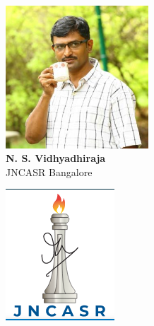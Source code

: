\documentclass[aspectratio=169,t]{beamer}
\begin{document}
\begin{frame}{}
\begin{minipage}{0.3\textwidth}
	\centering
	\includegraphics[width=0.4\textwidth]{nsv.jpeg}\\
	\footnotesize{{\bf N. S. Vidhyadhiraja}\\
	JNCASR Bangalore}
\end{minipage}
\hspace*{\fill}
\begin{minipage}{0.1\textwidth}
	\includegraphics[width=\textwidth]{JNCASR.png}\\
\end{minipage}
\hspace*{\fill}

\end{frame}
\end{document}
